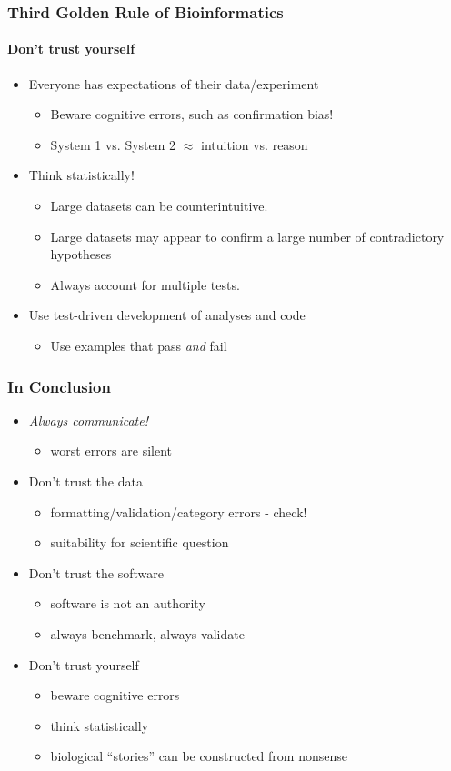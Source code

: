 \documentclass[table]{beamer}
\begin{document}
  \begin{frame}
    \frametitle{Third Golden Rule of Bioinformatics}
    \framesubtitle{Don't trust yourself}
	\begin{itemize}
	  \item Everyone has expectations of their data/experiment
	    \begin{itemize}
	      \item Beware cognitive errors, such as confirmation bias!
	      \item System 1 vs. System 2 $\approx$ intuition vs. reason
	    \end{itemize}
	  \item Think statistically! 
	    \begin{itemize}
	      \item Large datasets can be counterintuitive.
	      \item Large datasets may appear to confirm a large number of contradictory hypotheses
	      \item Always account for multiple tests.
	    \end{itemize}
	  \item Use test-driven development of analyses and code
	    \begin{itemize}
	      \item Use examples that pass \textit{and} fail
	    \end{itemize}	  
	\end{itemize}
  \end{frame}

  \begin{frame}
    \frametitle{In Conclusion}
	\begin{itemize}
	  \item \emph{Always communicate!}
	    \begin{itemize}
	      \item worst errors are silent
	    \end{itemize}	  
	  \item Don't trust the data
	    \begin{itemize}
	      \item formatting/validation/category errors - check!
	      \item suitability for scientific question
	    \end{itemize}
	  \item Don't trust the software
	    \begin{itemize}
	      \item software is not an authority
	      \item always benchmark, always validate
	    \end{itemize}
	  \item Don't trust yourself
	    \begin{itemize}
	      \item beware cognitive errors
	      \item think statistically
	      \item biological ``stories'' can be constructed from nonsense
	    \end{itemize}	  
	\end{itemize}
  \end{frame}
\end{document}
